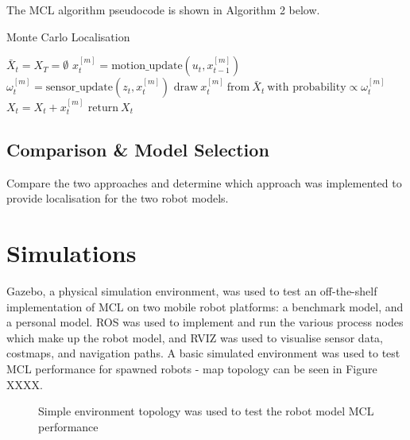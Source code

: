 \documentclass[a4paper]{article}
\begin{document}
The MCL algorithm pseudocode is shown in Algorithm 2 below.
\begin{algorithm}
\caption{Monte Carlo Localisation}
\begin{algorithmic}[1]
\State $\bar{X}_t = X_T = \emptyset$
	\State $x^{[m]}_t = \text{motion\_update}(u_t, x^{[m]}_{t-1})$
	\State $\omega^{[m]}_t = \text{sensor\_update}(z_t, x^{[m]}_t)$
\EndFor
{}
	\State $\text{draw} \ x^{[m]}_t \ \text{from} \  \bar{X}_t \ \text{with probability} \propto \omega^{[m]}_t$
	\State $X_t = X_t + x^{[m]}_t$
\EndFor
\State $\text{return} \ X_t$
\EndProcedure
\end{algorithmic}
\end{algorithm}

\subsection{Comparison \& Model Selection}
Compare the two approaches and determine which approach was implemented to provide localisation for the two robot models.

\newpage

\section{Simulations}
Gazebo, a physical simulation environment, was used to test an off-the-shelf implementation of MCL on two mobile robot platforms: a benchmark model, and a personal model. ROS was used to implement and run the various process nodes which make up the robot model, and RVIZ was used to visualise sensor data, costmaps, and navigation paths. A basic simulated environment was used to test MCL performance for spawned robots - map topology can be seen in Figure XXXX.
\begin{figure}[h]
\centering
{}
\caption{Simple environment topology was used to test the robot model MCL performance}
\end{figure}
\end{document}
